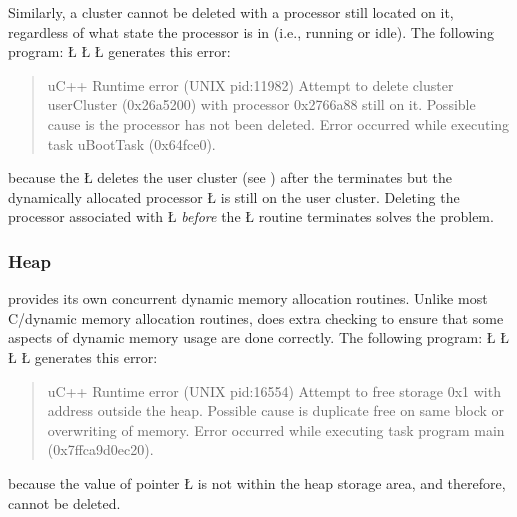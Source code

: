 \documentclass[openright,twoside]{report}
\begin{document}
Similarly, a cluster cannot be deleted with a processor still located on it, regardless of what state the processor is in (i.e., running or idle).
The following program:
\LGinlinefalse\LGbegin\lgrinde
\L{}
\L{\LB{}}
\L{\LB{\}}}
\endlgrinde\LGend
generates this error:
\begin{quote}
\BGfont
uC++ Runtime error (UNIX pid:11982) Attempt to delete cluster userCluster (0x26a5200) with processor 0x2766a88 still on it.
Possible cause is the processor has not been deleted.
Error occurred while executing task uBootTask (0x64fce0).
\end{quote}
because the \LGinlinetrue\LGbegin\lgrinde\L{}\endlgrinde\LGend{} deletes the user cluster (see ) after the  terminates but the dynamically allocated processor \LGinlinetrue\LGbegin\lgrinde\L{}\endlgrinde\LGend{} is still on the user cluster.
Deleting the processor associated with \LGinlinetrue\LGbegin\lgrinde\L{}\endlgrinde\LGend{} \emph{before} the \LGinlinetrue\LGbegin\lgrinde\L{}\endlgrinde\LGend{} routine terminates solves the problem.


\subsubsection{Heap}
\label{s:Heap}

\uC provides its own concurrent dynamic memory allocation routines.
Unlike most C/\CC dynamic memory allocation routines, \uC does extra checking to ensure that some aspects of dynamic memory usage are done correctly.
The following program:
\LGinlinefalse\LGbegin\lgrinde
\L{}
\L{\LB{}}
\CE{}\L{\LB{}}
\L{\LB{\}}}
\endlgrinde\LGend
generates this error:
\begin{quote}
\BGfont
uC++ Runtime error (UNIX pid:16554) Attempt to free storage 0x1 with address outside the heap.
Possible cause is duplicate free on same block or overwriting of memory.
Error occurred while executing task program main (0x7ffca9d0ec20).
\end{quote}
because the value of pointer \LGinlinetrue\LGbegin\lgrinde\L{}\endlgrinde\LGend{} is not within the heap storage area, and therefore, cannot be deleted.
\end{document}
